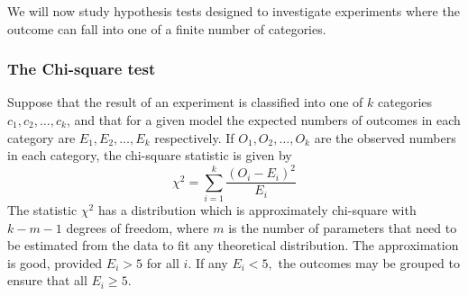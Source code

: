 \documentclass[12pt]{article}
\begin{document}
We will now study hypothesis tests designed to investigate experiments where the outcome can fall into one of a finite number of categories.

\subsubsection{The Chi-square test}
Suppose that the result of an experiment is classified into one of $k$ categories $c_{1},c_{2},\ldots,c_{k}$, and that for a given model the expected numbers of outcomes in each category are $E_{1},E_{2},\ldots,E_{k}$ respectively. If $O_{1},O_{2},\ldots,O_{k}$ are the observed numbers in each category, the chi-square statistic is given by
$$
\chi^{2}=\sum_{i=1}^{k}\frac{(O_{i}-E_{i})^2}{E_{i}}
$$
The statistic $\chi^2$ has a distribution which is approximately chi-square with $k-m-1$ degrees of freedom, where $m$ is the number of parameters that need to be estimated from the data to fit any theoretical distribution. The approximation is good, provided $E_{i}>5$ for all $i$. If any $E_{i}<5,$ the outcomes may be grouped to ensure that all $E_{i}\geq 5.$
\end{document}
